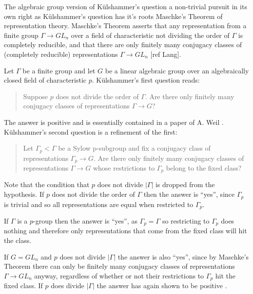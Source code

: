 The algebraic group version of K\"ulshammer's question a non-trivial pursuit in its own right as K\"ulshammer's question has it's roots Maschke's Theorem of representation theory. Maschke's Theorem asserts that any representation from a finite group $\Gamma \rightarrow GL_n$ over a field of characteristic not dividing the order of $\Gamma$ is completely reducible, and that there are only finitely many conjugacy classes of (completely reducible) representations $\Gamma \rightarrow GL_n$ [ref Lang].

Let $\Gamma$ be a finite group and let $G$ be a linear algebraic group over an algebraically closed field of characteristic $p$. K\"ulshammer's first question reads:
\begin{quote}
  Suppose $p$ does not divide the order of $\Gamma$. Are there only finitely many conjugacy classes of representations $\Gamma\rightarrow G$?
\end{quote}
The answer is positive and is essentially contained in a paper of A. Weil \cite{weil1964remarks}. K\"ulshammer's second question is a refinement of the first:
\begin{quote}
  Let $\Gamma_p < \Gamma$ be a Sylow p-subgroup and fix a conjugacy class of representations $\Gamma_p\rightarrow G$. Are there only finitely many conjugacy classes of representations $\Gamma\rightarrow G$ whose restrictions to $\Gamma_p$ belong to the fixed class?
\end{quote}
Note that the condition that $p$ does not divide $|\Gamma|$ is dropped from the hypothesis. If $p$ does not divide the order of $\Gamma$ then the answer is ``yes'', since $\Gamma_p$ is trivial and so all representations are equal when restricted to $\Gamma_p$.

If $\Gamma$ is a $p$-group then the answer is ``yes'', as $\Gamma_p = \Gamma$ so restricting to $\Gamma_p$ does nothing and therefore only representations that come from the fixed class will hit the class.

If $G=GL_n$ and $p$ does not divide $|\Gamma|$ the answer is also ``yes'', since by Maschke's Theorem there can only be finitely many conjugacy classes of representations $\Gamma\rightarrow GL_n$ anyway, regardless of whether or not their restrictions to $\Gamma_p$ hit the fixed class. If $p$ does divide $|\Gamma|$ the answer has again shown to be positive \cite[Theorem]{slodowy1997two}.

